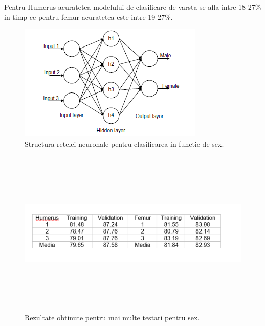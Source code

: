 \documentclass[runningheads,a4paper,11pt]{report}
\begin{document}
\noindent Pentru Humerus acuratetea modelului de clasificare de varsta se afla intre 18-27\% in timp ce pentru femur acuratetea este intre 19-27\%. \newline 
 
\begin{figure}[h!]
\centerline{\includegraphics{Imagini/retea.PNG}}
\caption{Structura retelei neuronale pentru clasificarea in functie de sex.}
\label{fig}
\end{figure}

\begin{figure}[h!]
\centerline{\includegraphics[height=8cm,width=20cm]{Imagini/tabel_date_acuratete.PNG}}
\caption{Rezultate obtinute pentru mai multe testari pentru sex.}
\label{fig}
\end{figure}
\end{document}
